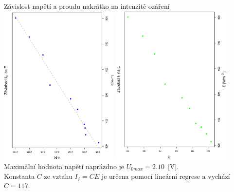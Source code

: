 \documentclass[10pt]{article}
\begin{document}
Závislost napětí a proudu nakrátko na intenzitě ozáření \\
\includegraphics[width=6cm,angle=270]{graf1.eps}
\includegraphics[width=6cm,angle=270]{graf2.eps} \\[1cm]

\noindent
Maximální hodnota napětí naprázdno je $U_{0max} = 2.10$~[V]. \\
Konstanta $C$ ze vztahu $I_f = CE$ je určena pomocí lineární regrese a vychází
$C = 117$.
\end{document}
